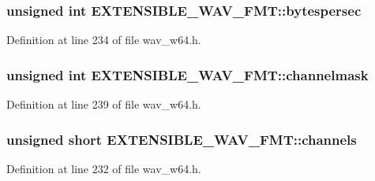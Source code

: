 \subsubsection[{\texorpdfstring{bytespersec}{bytespersec}}]{\setlength{\rightskip}{0pt plus 5cm}unsigned {\bf int} E\+X\+T\+E\+N\+S\+I\+B\+L\+E\+\_\+\+W\+A\+V\+\_\+\+F\+M\+T\+::bytespersec}\hypertarget{struct_e_x_t_e_n_s_i_b_l_e___w_a_v___f_m_t_af3fc5c0f505bb161fe4a9bd06b7010cd}{}\label{struct_e_x_t_e_n_s_i_b_l_e___w_a_v___f_m_t_af3fc5c0f505bb161fe4a9bd06b7010cd}


Definition at line 234 of file wav\+\_\+w64.\+h.

\subsubsection[{\texorpdfstring{channelmask}{channelmask}}]{\setlength{\rightskip}{0pt plus 5cm}unsigned {\bf int} E\+X\+T\+E\+N\+S\+I\+B\+L\+E\+\_\+\+W\+A\+V\+\_\+\+F\+M\+T\+::channelmask}\hypertarget{struct_e_x_t_e_n_s_i_b_l_e___w_a_v___f_m_t_adcbcad5e3daa47055e3103268bdf0926}{}\label{struct_e_x_t_e_n_s_i_b_l_e___w_a_v___f_m_t_adcbcad5e3daa47055e3103268bdf0926}


Definition at line 239 of file wav\+\_\+w64.\+h.

\subsubsection[{\texorpdfstring{channels}{channels}}]{\setlength{\rightskip}{0pt plus 5cm}unsigned short E\+X\+T\+E\+N\+S\+I\+B\+L\+E\+\_\+\+W\+A\+V\+\_\+\+F\+M\+T\+::channels}\hypertarget{struct_e_x_t_e_n_s_i_b_l_e___w_a_v___f_m_t_a4825c5cd25936d010d930c0e57b5b012}{}\label{struct_e_x_t_e_n_s_i_b_l_e___w_a_v___f_m_t_a4825c5cd25936d010d930c0e57b5b012}


Definition at line 232 of file wav\+\_\+w64.\+h.

